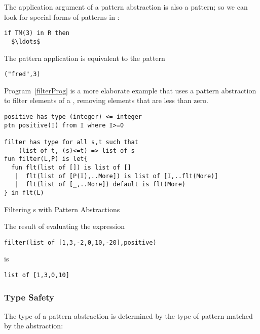 The application argument of a pattern abstraction is also a pattern; so we can look for special forms of  patterns in :
\begin{lstlisting}[mathescape=true]
if TM(3) in R then
  $\ldots$
\end{lstlisting}
The pattern application  is equivalent to the pattern 
\begin{lstlisting}
("fred",3)
\end{lstlisting}
Program~\vref{filterProg} is a more elaborate example that uses a pattern abstraction to filter elements of a , removing elements that are less than zero.
\begin{program}
\begin{lstlisting}
positive has type (integer) <= integer
ptn positive(I) from I where I>=0
  
filter has type for all s,t such that
    (list of t, (s)<=t) => list of s
fun filter(L,P) is let{
  fun flt(list of []) is list of []
   |  flt(list of [P(I),..More]) is list of [I,..flt(More)]
   |  flt(list of [_,..More]) default is flt(More)
} in flt(L)
\end{lstlisting}
\caption{Filtering s with Pattern Abstractions\label{filterProg}}
\end{program}
The result of evaluating the expression
\begin{lstlisting}
filter(list of [1,3,-2,0,10,-20],positive)
\end{lstlisting}
is
\begin{lstlisting}
list of [1,3,0,10]
\end{lstlisting}

\subsubsection{Type Safety}
The type of a pattern abstraction is determined by the type of pattern matched by the abstraction:
\begin{prooftree}
\end{prooftree}
